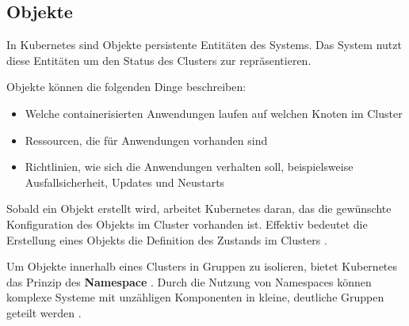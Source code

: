\subsection{Objekte}
\label{sec:kubernetes:objekte}
In Kubernetes sind Objekte persistente Entitäten des Systems. 
Das System nutzt diese Entitäten um den Status des Clusters zur repräsentieren.

Objekte können die folgenden Dinge beschreiben:
\begin{itemize}
  \item Welche containerisierten Anwendungen laufen auf welchen Knoten im Cluster
  \item Ressourcen, die für Anwendungen vorhanden sind
  \item Richtlinien, wie sich die Anwendungen verhalten soll, beispielsweise Ausfallsicherheit, Updates und Neustarts
\end{itemize}

Sobald ein Objekt erstellt wird, arbeitet Kubernetes daran, das die gewünschte Konfiguration des Objekts
im Cluster vorhanden ist. 
Effektiv bedeutet die Erstellung eines Objekts die Definition des Zustands im Clusters \cite{KuberneteObjects_2021}.

Um Objekte innerhalb eines Clusters in Gruppen zu isolieren, bietet Kubernetes das Prinzip des \textbf{Namespace} \cite{kubernetesNamespaces}.
Durch die Nutzung von Namespaces können komplexe Systeme mit unzähligen Komponenten
in kleine, deutliche Gruppen geteilt werden \cite{Marko2018}.